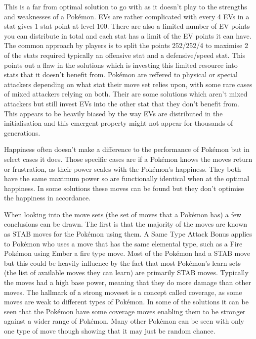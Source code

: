 \documentclass[a4paper]{article}
\newcommand{\Pokemon}{Pok\'{e}mon}
\begin{document}
This is a far from optimal solution to go with as it doesn't play to the strengths and weaknesses of a \Pokemon{}.
EVs are rather complicated with every 4 EVs in a stat gives 1 stat point at level 100.
There are also a limited number of EV points you can distribute in total and each stat has a limit of the EV points it can have.
The common approach by players is to split the points 252/252/4 to maximise 2 of the stats required typically an offensive stat and a defensive/speed stat.
This points out a flaw in the solutions which is investing this limited resource into stats that it doesn't benefit from.
\Pokemon{} are reffered to physical or special attackers depending on what stat their move set relies upon, with some rare cases of mixed attackers relying on both.
Their are some solutions which aren't mixed attackers but still invest EVs into the other stat that they don't benefit from.
This appears to be heavily biased by the way EVs are distributed in the initialisation and this emergent property might not appear for thousands of generations.
\par
Happiness often doesn't make a difference to the performance of \Pokemon{} but in select cases it does.
Those specific cases are if a \Pokemon{} knows the moves return or frustration, as their power scales with the \Pokemon{}'s happiness.
They both have the same maximum power so are functionally identical when at the optimal happiness.
In some solutions these moves can be found but they don't optimise the happiness in accordance.
\par
When looking into the move sets (the set of moves that a \Pokemon{} has) a few conclusions can be drawn.
The first is that the majority of the moves are known as STAB moves for the \Pokemon{} using them.
A Same Type Attack Bonus applies to \Pokemon{} who uses a move that has the same elemental type, such as a Fire \Pokemon{} using Ember a fire type move.
Most of the \Pokemon{} had a STAB move but this could be heavily influence by the fact that most \Pokemon{}'s learn sets (the list of available moves they can learn) are primarily STAB moves.
Typically the moves had a high base power, meaning that they do more damage than other moves.
The hallmark of a strong moveset is a concept called coverage, as some moves are weak to different types of \Pokemon{}.
In some of the solutions it can be seen that the \Pokemon{} have some coverage moves enabling them to be stronger against a wider range of \Pokemon{}.
Many other \Pokemon{} can be seen with only one type of move though showing that it may just be random chance.
\end{document}
